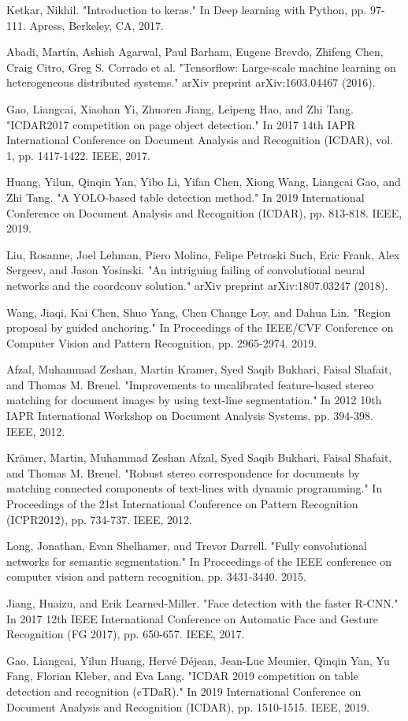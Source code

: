 \documentclass{ieeeaccess}
\begin{document}
\begin{thebibliography}{00}
 Ketkar, Nikhil. "Introduction to keras." In Deep learning with Python, pp. 97-111. Apress, Berkeley, CA, 2017.

 Abadi, Martín, Ashish Agarwal, Paul Barham, Eugene Brevdo, Zhifeng Chen, Craig Citro, Greg S. Corrado et al. "Tensorflow: Large-scale machine learning on heterogeneous distributed systems." arXiv preprint arXiv:1603.04467 (2016).

 Gao, Liangcai, Xiaohan Yi, Zhuoren Jiang, Leipeng Hao, and Zhi Tang. "ICDAR2017 competition on page object detection." In 2017 14th IAPR International Conference on Document Analysis and Recognition (ICDAR), vol. 1, pp. 1417-1422. IEEE, 2017.


 Huang, Yilun, Qinqin Yan, Yibo Li, Yifan Chen, Xiong Wang, Liangcai Gao, and Zhi Tang. "A YOLO-based table detection method." In 2019 International Conference on Document Analysis and Recognition (ICDAR), pp. 813-818. IEEE, 2019.


 Liu, Rosanne, Joel Lehman, Piero Molino, Felipe Petroski Such, Eric Frank, Alex Sergeev, and Jason Yosinski. "An intriguing failing of convolutional neural networks and the coordconv solution." arXiv preprint arXiv:1807.03247 (2018).


 Wang, Jiaqi, Kai Chen, Shuo Yang, Chen Change Loy, and Dahua Lin. "Region proposal by guided anchoring." In Proceedings of the IEEE/CVF Conference on Computer Vision and Pattern Recognition, pp. 2965-2974. 2019.

 Afzal, Muhammad Zeshan, Martin Kramer, Syed Saqib Bukhari, Faisal Shafait, and Thomas M. Breuel. "Improvements to uncalibrated feature-based stereo matching for document images by using text-line segmentation." In 2012 10th IAPR International Workshop on Document Analysis Systems, pp. 394-398. IEEE, 2012.

 Krämer, Martin, Muhammad Zeshan Afzal, Syed Saqib Bukhari, Faisal Shafait, and Thomas M. Breuel. "Robust stereo correspondence for documents by matching connected components of text-lines with dynamic programming." In Proceedings of the 21st International Conference on Pattern Recognition (ICPR2012), pp. 734-737. IEEE, 2012.

 Long, Jonathan, Evan Shelhamer, and Trevor Darrell. "Fully convolutional networks for semantic segmentation." In Proceedings of the IEEE conference on computer vision and pattern recognition, pp. 3431-3440. 2015.

 Jiang, Huaizu, and Erik Learned-Miller. "Face detection with the faster R-CNN." In 2017 12th IEEE International Conference on Automatic Face and Gesture Recognition (FG 2017), pp. 650-657. IEEE, 2017.


 Gao, Liangcai, Yilun Huang, Hervé Déjean, Jean-Luc Meunier, Qinqin Yan, Yu Fang, Florian Kleber, and Eva Lang. "ICDAR 2019 competition on table detection and recognition (cTDaR)." In 2019 International Conference on Document Analysis and Recognition (ICDAR), pp. 1510-1515. IEEE, 2019.

\end{thebibliography}
\end{document}
